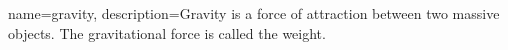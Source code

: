 {
    name=gravity,
    description={Gravity is a force of attraction between two massive objects.  The gravitational force is called the weight.}
    }
